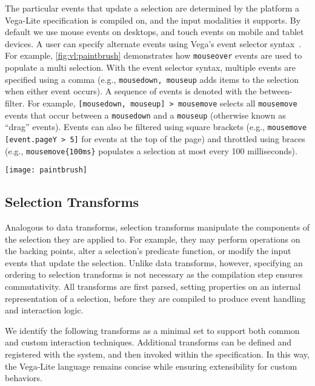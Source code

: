 The particular events that update a selection are determined by the platform a
Vega-Lite specification is compiled on, and the input modalities it supports. By
default we use mouse events on desktops, and touch events on mobile and tablet
devices. A user can specify alternate events using Vega's event selector
syntax~\cite{reactive-vega-model}. For example, \cref{fig:vl:paintbrush}
demonstrates how \texttt{mouseover} events are used to populate a multi
selection. With the event selector syntax, multiple events are specified using a
comma (e.g., \texttt{mousedown, mouseup} adds items to the selection when either
event occurs). A sequence of events is denoted with the between-filter. For
example, \texttt{[mousedown, mouseup] > mousemove} selects all
\texttt{mousemove} events that occur between a \texttt{mousedown} and a
\texttt{mouseup} (otherwise known as ``drag'' events). Events can also be
filtered using square brackets (e.g., \texttt{mousemove [event.pageY > 5]} for
events at the top of the page) and throttled using braces (e.g.,
\texttt{mousemove\{100ms\}} populates a selection at most every 100
milliseconds).

\begin{figure*}[h!]
  \centering
  \texttt{[image: paintbrush]}
  \caption{Specifying a custom event trigger for a \emph{multi} selection: the
  first point is selected on \texttt{mouseover} and subsequent points when the
  shift key is pressed.}
  \label{fig:vl:paintbrush}
\end{figure*}

\subsection{Selection Transforms}

Analogous to data transforms, selection transforms manipulate the components of
the selection they are applied to. For example, they may perform operations on
the backing points, alter a selection's predicate function, or modify the input
events that update the selection. Unlike data transforms, however, specifying an
ordering to selection transforms is not necessary as the compilation step
ensures commutativity. All transforms are first parsed, setting properties on an
internal representation of a selection, before they are compiled to produce
event handling and interaction logic.

We identify the following transforms as a minimal set to support both common and
custom interaction techniques. Additional transforms can be defined and
registered with the system, and then invoked within the specification. In this
way, the Vega-Lite language remains concise while ensuring extensibility for
custom behaviors.

